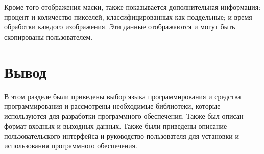 Кроме того отображения маски, также показывается дополнительная информация: процент и количество пикселей, классифицированных как поддельные; и время обработки каждого изображения. Эти данные отображаются и могут быть скопированы пользователем.

\section*{Вывод}

В этом разделе были приведены выбор языка программирования и средства программирования и рассмотрены необходимые библиотеки, которые используются для разработки программного обеспечения. Также был описан формат входных и выходных данных. Также были приведены описание пользовательского интерфейса и руководство пользователя для установки и использования программного обеспечения.